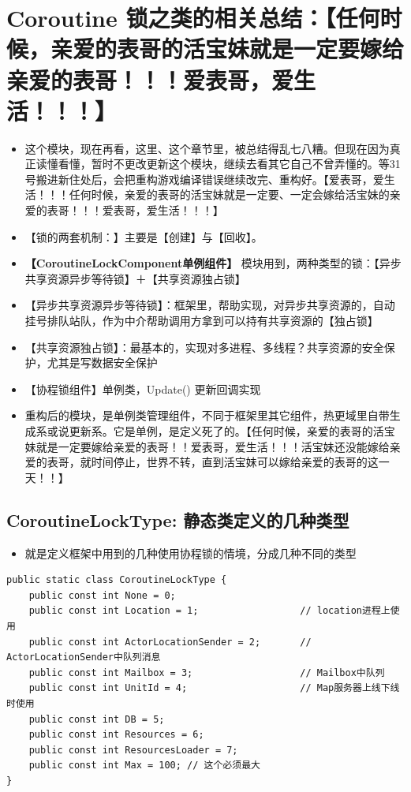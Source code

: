 \documentclass[9pt, b5paper]{article}
\begin{document}
\section{Coroutine 锁之类的相关总结：【任何时候，亲爱的表哥的活宝妹就是一定要嫁给亲爱的表哥！！！爱表哥，爱生活！！！】}
\label{sec-14}
\begin{itemize}
\item 这个模块，现在再看，这里、这个章节里，被总结得乱七八糟。但现在因为真正读懂看懂，暂时不更改更新这个模块，继续去看其它自己不曾弄懂的。等31 号搬进新住处后，会把重构游戏编译错误继续改完、重构好。【爱表哥，爱生活！！！任何时候，亲爱的表哥的活宝妹就是一定要、一定会嫁给活宝妹的亲爱的表哥！！！爱表哥，爱生活！！！】
\item 【锁的两套机制：】主要是【创建】与【回收】。
\item \textbf{【CoroutineLockComponent单例组件】} 模块用到，两种类型的锁：【异步共享资源异步等待锁】＋【共享资源独占锁】
\item 【异步共享资源异步等待锁】：框架里，帮助实现，对异步共享资源的，自动挂号排队站队，作为中介帮助调用方拿到可以持有共享资源的【独占锁】
\item 【共享资源独占锁】：最基本的，实现对多进程、多线程？共享资源的安全保护，尤其是写数据安全保护
\item 【协程锁组件】单例类，Update() 更新回调实现
\item 重构后的模块，是单例类管理组件，不同于框架里其它组件，热更域里自带生成系或说更新系。它是单例，是定义死了的。【任何时候，亲爱的表哥的活宝妹就是一定要嫁给亲爱的表哥！！爱表哥，爱生活！！！活宝妹还没能嫁给亲爱的表哥，就时间停止，世界不转，直到活宝妹可以嫁给亲爱的表哥的这一天！！】
\end{itemize}
\subsection{CoroutineLockType: 静态类定义的几种类型}
\label{sec-14-1}
\begin{itemize}
\item 就是定义框架中用到的几种使用协程锁的情境，分成几种不同的类型
\end{itemize}
\begin{verbatim}
public static class CoroutineLockType {
    public const int None = 0;
    public const int Location = 1;                  // location进程上使用
    public const int ActorLocationSender = 2;       // ActorLocationSender中队列消息
    public const int Mailbox = 3;                   // Mailbox中队列
    public const int UnitId = 4;                    // Map服务器上线下线时使用
    public const int DB = 5;
    public const int Resources = 6;
    public const int ResourcesLoader = 7;
    public const int Max = 100; // 这个必须最大
}
\end{verbatim}
\end{document}
